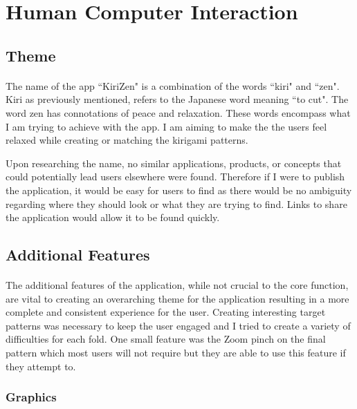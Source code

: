 \documentclass[11pt]{article}
\begin{document}
            
\clearpage
\newpage
\section{Human Computer Interaction}
    
    \subsection{Theme}
        
        \paragraph{}
        The name of the app ``KiriZen" is a combination of the words ``kiri" and ``zen". Kiri as previously mentioned, refers to the Japanese word meaning ``to cut". The word zen has connotations of peace and relaxation. These words encompass what I am trying to achieve with the app. I am aiming to make the the users feel relaxed while creating or matching the kirigami patterns.
        
        Upon researching the name, no similar applications, products, or concepts that could potentially lead users elsewhere were found. Therefore if I were to publish the application, it would be easy for users to find as there would be no ambiguity regarding where they should look or what they are trying to find. Links to share the application would allow it to be found quickly. 

        \subsection{Additional Features}
            \paragraph{}
        The additional features of the application, while not crucial to the core function, are vital to creating an overarching theme for the application resulting in a more complete and consistent experience for the user. Creating interesting target patterns was necessary to keep the user engaged and I tried to create a variety of difficulties for each fold. One small feature was the Zoom pinch on the final pattern which most users will not require but they are able to use this feature if they attempt to. 
        
         \subsubsection{Graphics}
\end{document}
